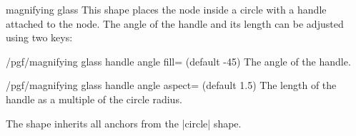 \begin{shape}{magnifying glass}
  This shape places the node inside a circle with a handle attached to
  the node. The angle of the handle and its length can be adjusted
  using two keys:

  \begin{key}{/pgf/magnifying glass handle angle fill= (default -45)}
    The angle of the handle.
  \end{key}

  \begin{key}{/pgf/magnifying glass handle angle aspect= (default 1.5)}
    The length of the handle as a multiple of the circle radius.
  \end{key}

\begin{codeexample}[]
\end{codeexample}
  The shape inherits all anchors from the |circle| shape.
\end{shape}


